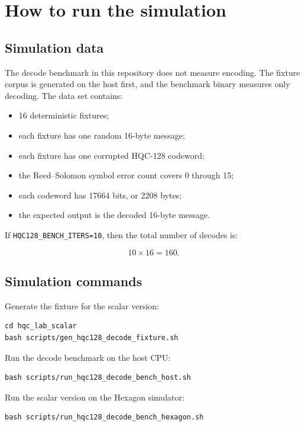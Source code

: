 \documentclass[12pt,a4paper]{article}
\begin{document}
\section{How to run the simulation}

\subsection{Simulation data}

The decode benchmark in this repository does not measure encoding. The fixture corpus is generated on the host first, and the benchmark binary measures only decoding. The data set contains:

\begin{itemize}
    \item 16 deterministic fixtures;
    \item each fixture has one random 16-byte message;
    \item each fixture has one corrupted HQC-128 codeword;
    \item the Reed--Solomon symbol error count covers 0 through 15;
    \item each codeword has 17664 bits, or 2208 bytes;
    \item the expected output is the decoded 16-byte message.
\end{itemize}

If \texttt{HQC128\_BENCH\_ITERS=10}, then the total number of decodes is:

\[
10 \times 16 = 160.
\]

\subsection{Simulation commands}

Generate the fixture for the scalar version:

\begin{lstlisting}[style=bashstyle]
cd hqc_lab_scalar
bash scripts/gen_hqc128_decode_fixture.sh
\end{lstlisting}

Run the decode benchmark on the host CPU:

\begin{lstlisting}[style=bashstyle]
bash scripts/run_hqc128_decode_bench_host.sh
\end{lstlisting}

Run the scalar version on the Hexagon simulator:

\begin{lstlisting}[style=bashstyle]
bash scripts/run_hqc128_decode_bench_hexagon.sh
\end{lstlisting}
\end{document}
